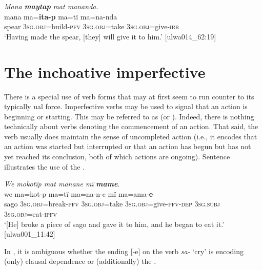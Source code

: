 \ea%
    \label{ex:verbs:64}
          \textit{Mana} \textbf{\textit{maytap}} \textit{mat mananda.}\\
\gll    mana  ma=\textbf{ita-p}         ma=tï      ma=na-nda\\
    spear  3\textsc{sg.obj}=build-\textsc{pfv}  3\textsc{sg.obj}=take   3\textsc{sg.obj}=give-\textsc{irr}\\
\glt `Having made the spear, [they] will give it to him.’ [ulwa014\_62:19]
\z

\section{The inchoative imperfective}\label{sec:4.10}


There is a special use of  verb forms that may at first seem to run counter to its typically  ual force. Imperfective verbs may be used to signal that an action is beginning or starting. This may be referred to as   (or  ). Indeed, there is nothing technically  about verbs denoting the commencement of an action. That said, the   verb usually does maintain the sense of uncompleted action (i.e., it encodes that an action was started but interrupted or that an action has begun but has not yet reached its conclusion, both of which actions are ongoing). Sentence  illustrates the use of the  .

\ea%
    \label{ex:verbs:65}

          \textit{We mokotïp mat manane mï} \textbf{\textit{mame}}.\\
\gll we    ma=kot-p        ma=tï      ma=na-n-e mï      ma=ama-\textbf{e}\\
    sago  3\textsc{sg.obj}=break{}-\textsc{pfv}  \textsc{3sg.obj}=take  3\textsc{sg.obj}=give\textsc{{}-pfv-dep}    \textsc{3sg.subj}  \textsc{3sg.obj}=eat-\textsc{ipfv}\\


\glt `[He] broke a piece of sago and gave it to him, and he began to eat it.’ [ulwa001\_11:42]
\z

In , it is ambiguous whether the ending [-e] on the verb \textit{sa-} ‘cry’ is encoding (only) clausal dependence or (additionally) the   .

